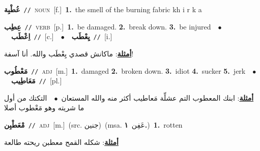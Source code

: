 \documentclass[10pt,a4paper,twoside]{article} %
\begin{document}
\begin{multicols}{2}
{\setlength\topsep{0pt}\textbf{\foreignlanguage{arabic}{عُطْبِة}}\ {\color{gray}\texttt{//}\color{black}}\ \textsc{noun}\ [f.]\ \textbf{1.}~the smell of the burning fabric kh i r k a\ } \vspace{2mm}

{\setlength\topsep{0pt}\textbf{\foreignlanguage{arabic}{عِطِب}}\ {\color{gray}\texttt{//}\color{black}}\ \textsc{verb}\ [p.]\ \textbf{1.}~be damaged.  \textbf{2.}~break down.  \textbf{3.}~be injured\ \ $\bullet$\ \ \setlength\topsep{0pt}\textbf{\foreignlanguage{arabic}{اِعْطَب}}\ {\color{gray}\texttt{//}\color{black}}\ [c.]\ \ $\bullet$\ \ \setlength\topsep{0pt}\textbf{\foreignlanguage{arabic}{يِعْطَب}}\ {\color{gray}\texttt{//}\color{black}}\ [i.]\  \begin{flushright}\color{gray}\foreignlanguage{arabic}{\textbf{\underline{\foreignlanguage{arabic}{أمثلة}}}: ماكانش قصدي يِعْطَب والله. أنا آسفة!}\end{flushright}\color{black}} \vspace{2mm}

{\setlength\topsep{0pt}\textbf{\foreignlanguage{arabic}{مَعْطُوب}}\ {\color{gray}\texttt{//}\color{black}}\ \textsc{adj}\ [m.]\ \textbf{1.}~damaged  \textbf{2.}~broken down.  \textbf{3.}~idiot  \textbf{4.}~sucker  \textbf{5.}~jerk\ \ $\bullet$\ \ \setlength\topsep{0pt}\textbf{\foreignlanguage{arabic}{مَعَاطِيب}}\ {\color{gray}\texttt{//}\color{black}}\ [pl.]\  \begin{flushright}\color{gray}\foreignlanguage{arabic}{\textbf{\underline{\foreignlanguage{arabic}{أمثلة}}}: ابنك المعطوب التم عشلِّة مَعاطيب أكثر منه والله المستعان\ $\bullet$\ \  التكتك من أول ما شريته وهو مَعْطوب أصلا}\end{flushright}\color{black}} \vspace{2mm}

{\setlength\topsep{0pt}\textbf{\foreignlanguage{arabic}{مْعَطْبِن}}\ {\color{gray}\texttt{//}\color{black}}\ \textsc{adj}\ [m.]\ (src. \color{gray}\foreignlanguage{arabic}{جنين}\color{black})\ \color{gray}(msa. \foreignlanguage{arabic}{عَفِن}~\foreignlanguage{arabic}{\textbf{١.}})\color{black}\ \textbf{1.}~rotten\  \begin{flushright}\color{gray}\foreignlanguage{arabic}{\textbf{\underline{\foreignlanguage{arabic}{أمثلة}}}: شكله القمح معطبن ريحته طالعة}\end{flushright}\color{black}} \vspace{2mm}


\end{multicols}
\end{document}
